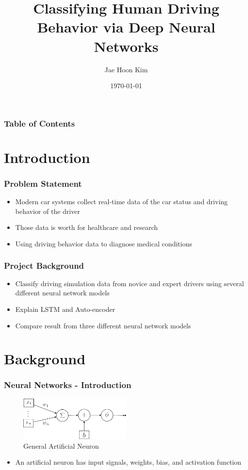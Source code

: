 \documentclass{beamer}
\title{Classifying Human Driving Behavior via Deep Neural Networks}
\author{Jae Hoon Kim}
\institute{Drexel University}
\date{\today}
\begin{document}
\frame{\titlepage}


\begin{frame}
\frametitle{Table of Contents}
\tableofcontents
\end{frame}

\section{Introduction}
\begin{frame}
\frametitle{Problem Statement}
\begin{itemize}
\item Modern car systems collect real-time data of the car status and driving behavior of the driver
\item Those data is worth for healthcare and research
\item Using driving behavior data to diagnose medical conditions
\end{itemize}
\end{frame}

\begin{frame}
\frametitle{Project Background}
\begin{itemize}
\item Classify driving simulation data from novice and expert drivers using several different neural network models
\item Explain LSTM and Auto-encoder
\item Compare result from three different neural network models
\end{itemize}
\end{frame}

\section{Background}
\begin{frame}
\frametitle{Neural Networks - Introduction}
\begin{figure}[t!]
    \centering
    \includegraphics[width=0.5\textwidth]{../paper/pictures/figures/general_AN.png}
    \caption{General Artificial Neuron}
    \label{fig:general_AN}
\end{figure}

\begin{itemize}
\item An artificial neuron has input signals, weights, bias, and activation function
\end{itemize}
\end{frame}
\end{document}
